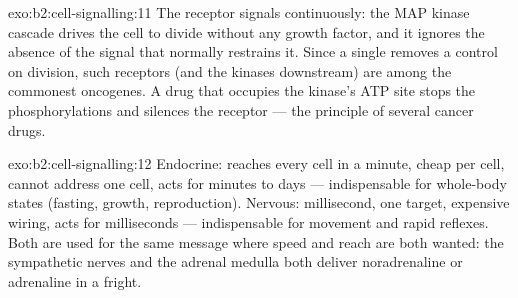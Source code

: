 \begin{solution}{exo:b2:cell-signalling:11}
The receptor signals continuously: the MAP kinase cascade drives the
cell to divide without any growth factor, and it ignores the
absence of the signal that normally restrains it. Since a single
 removes a control on division, such receptors (and the
kinases downstream) are among the commonest oncogenes. A drug that
occupies the kinase's ATP site stops the phosphorylations and
silences the receptor --- the principle of several cancer drugs.
\end{solution}

\begin{solution}{exo:b2:cell-signalling:12}
Endocrine: reaches every cell in a minute, cheap per cell, cannot
address one cell, acts for minutes to days --- indispensable for
whole-body states (fasting, growth, reproduction). Nervous:
millisecond, one target, expensive wiring, acts for milliseconds
--- indispensable for movement and rapid reflexes. Both are used for
the same message where speed and reach are both wanted: the
sympathetic nerves and the adrenal medulla both deliver
noradrenaline or adrenaline in a fright.
\end{solution}

